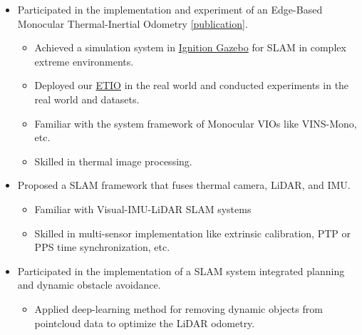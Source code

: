 \documentclass[11pt,a4paper]{moderncv}        %
\begin{document}
%
{
\begin{itemize}%
\item Participated in the implementation and experiment of an Edge-Based Monocular Thermal-Inertial Odometry \hyperref[sec:Publications]{[publication]}.
\begin{itemize}%
\hypersetup{urlcolor=black}
\item Achieved a simulation system in \href{https://gazebosim.org/api/gazebo/2.10/index.html}{Ignition Gazebo} for SLAM in complex extreme environments.
\item Deployed our \hyperref[sec:Publications]{ETIO} in the real world and conducted experiments in the real world and datasets.
\item Familiar with the system framework of Monocular VIOs like VINS-Mono, etc.
\item Skilled in thermal image processing.
\end{itemize}
\item Proposed a SLAM framework that fuses thermal camera, LiDAR, and IMU.
\begin{itemize}%
\item Familiar with Visual-IMU-LiDAR SLAM systems
\item Skilled in multi-sensor implementation like extrinsic calibration, PTP or PPS time synchronization, etc.
\end{itemize}
\item Participated in the implementation of a SLAM system integrated planning and dynamic obstacle avoidance.  
\begin{itemize}%
\item Applied deep-learning method for removing dynamic objects from pointcloud data to optimize the LiDAR odometry.

\end{itemize}
\end{itemize}}
\end{document}
